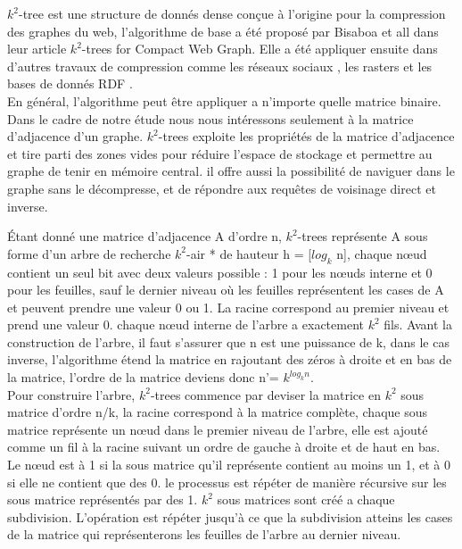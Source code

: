 $k^2$-tree est une structure de donnés dense conçue à l'origine pour la compression des graphes du web, l'algorithme de base a été proposé par Bisaboa et all dans leur article $k^2$-trees for Compact Web Graph. \citep{brisaboa2009k} Elle a été appliquer ensuite dans d'autres travaux de compression comme les réseaux sociaux \citep{shi2012optimizing}, les rasters \citep{de2013compact} et les bases de donnés RDF \citep{alvarez2017succinct}.\\
  
En général, l'algorithme peut être appliquer a n'importe quelle matrice binaire. Dans le cadre de notre étude nous nous intéressons seulement à la matrice d'adjacence d'un graphe.
$k^2$-trees exploite les propriétés de la matrice d'adjacence et tire parti des zones vides pour réduire l'espace de stockage et permettre au graphe de tenir en mémoire central. il offre aussi la possibilité de naviguer dans le graphe sans le décompresse, et de répondre aux requêtes de voisinage direct et inverse.

Étant donné une matrice d'adjacence A d'ordre n, $k^2$-trees représente A sous forme d'un arbre de recherche $k^2$-air * de hauteur h = [$log_{k}$ n], chaque nœud contient un seul bit avec deux valeurs possible : 1 pour les nœuds interne et 0 pour les feuilles, sauf le dernier niveau où les feuilles représentent les cases de A et peuvent prendre une valeur 0 ou 1. La racine correspond au premier niveau et prend une valeur 0. chaque nœud interne de l'arbre a exactement $k^2$ fils.  
Avant la construction de l'arbre, il faut s'assurer que n est une puissance de k, dans le cas inverse, l'algorithme étend la matrice en rajoutant des zéros à droite et en bas de la matrice, l'ordre de la matrice deviens donc n'= $k^{log_{k} n}$.\\

Pour construire l'arbre, $k^2$-trees commence par deviser la matrice en $k^{2}$ sous matrice d'ordre n/k, la racine correspond à la matrice complète, chaque sous matrice représente un nœud dans le premier niveau de l'arbre, elle est ajouté comme un fil à la racine suivant un ordre de gauche à droite et de haut en bas. Le nœud est à 1 si la sous matrice qu'il représente contient au moins un 1, et à 0 si elle ne contient que des 0. le processus est répéter de manière récursive sur les sous matrice représentés par des 1. $k^{2}$ sous matrices sont créé a chaque subdivision. L'opération est répéter jusqu'à ce que la subdivision atteins les cases de la matrice qui représenterons les feuilles de l'arbre au dernier niveau. 


